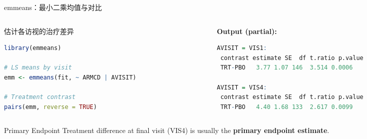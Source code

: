\documentclass[aspectratio=169,11pt]{beamer}
\begin{document}
\begin{frame}[fragile]{emmeans：最小二乘均值与对比}
\begin{columns}[T,totalwidth=\textwidth]
\begin{column}{0.48\textwidth}
\begin{block}{估计各访视的治疗差异}
\begin{lstlisting}[language=R,basicstyle=\ttfamily\scriptsize]
library(emmeans)

# LS means by visit
emm <- emmeans(fit, ~ ARMCD | AVISIT)

# Treatment contrast
pairs(emm, reverse = TRUE)
\end{lstlisting}
\end{block}
\end{column}
\begin{column}{0.48\textwidth}
\textbf{\footnotesize Output (partial):}
\begin{lstlisting}[language=R,numbers=none,basicstyle=\ttfamily\tiny]
AVISIT = VIS1:
 contrast estimate SE  df t.ratio p.value
 TRT-PBO   3.77 1.07 146  3.514 0.0006

AVISIT = VIS4:
 contrast estimate SE  df t.ratio p.value
 TRT-PBO   4.40 1.68 133  2.617 0.0099
\end{lstlisting}
\end{column}
\end{columns}

\vspace{0.1cm}
\begin{alertblock}{Primary Endpoint}
Treatment difference at final visit (VIS4) is usually the \textbf{primary endpoint estimate}.
\end{alertblock}
\end{frame}
\end{document}
